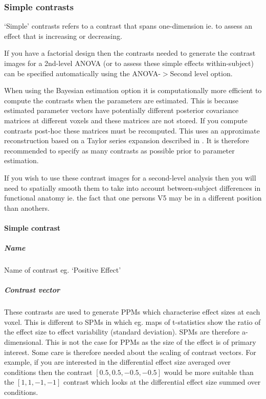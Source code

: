 \subsubsection{Simple contrasts}

`Simple' contrasts refers to a contrast that spans one-dimension ie. to assess an effect that is increasing or decreasing.

If you have a factorial design then the contrasts needed to generate the contrast images for a 2nd-level ANOVA (or to assess these simple effects within-subject) can be specified automatically using the ANOVA-$>$Second level option.

When using the Bayesian estimation option it is computationally more efficient to compute the contrasts when the parameters are estimated. This is because estimated parameter vectors have potentially different posterior covariance matrices at different voxels and these matrices are not stored. If you compute contrasts post-hoc these matrices must be recomputed. This uses an approximate reconstruction based on a Taylor series expansion described in \cite{vb3}. It is therefore recommended to specify as many contrasts as possible prior to parameter estimation.

If you wish to use these contrast images for a second-level analysis then you will need to spatially smooth them to take into account between-subject differences in functional anatomy ie. the fact that one persons V5 may be in a different position than anothers. 

\paragraph{Simple contrast}

\subparagraph{Name}

Name of contrast eg. `Positive Effect'

\subparagraph{Contrast vector}

These contrasts are used to generate PPMs which characterise effect sizes at each voxel. This is different to SPMs in which eg. maps of t-statistics show the ratio of the effect size to effect variability (standard deviation). SPMs are therefore a-dimensional. This is not the case for PPMs as the size of the effect is of primary interest. Some care is therefore needed about the scaling of contrast vectors. For example, if you are interested in the differential effect size averaged over conditions then the contrast $[0.5, 0.5, -0.5, -0.5]$ would be more suitable than the $[1, 1, -1, -1]$ contrast which looks at the differential effect size summed over conditions. 

